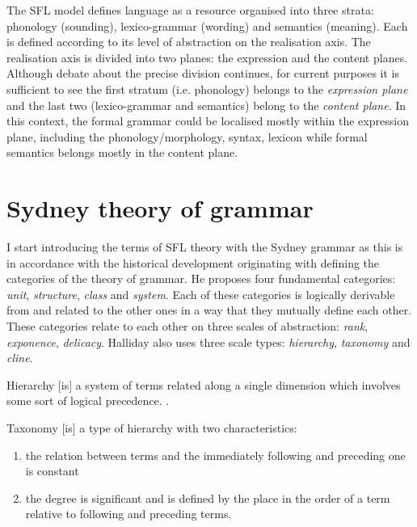     The SFL model defines language as a resource organised into three strata: phonology (sounding), lexico-grammar (wording) and semantics (meaning). Each is defined according to its level of abstraction on the realisation axis. The realisation axis is divided into two planes: the expression and the content planes. 
    Although debate about the precise division continues, for current purposes it is sufficient to see the first stratum (i.e. phonology) belongs to the \textit{expression plane} and the last two (lexico-grammar and semantics) belong to the \textit{content plane}.
    In this context, the formal grammar could be localised mostly within the expression plane, including the phonology/morphology, syntax, lexicon while formal semantics belongs mostly in the content plane.

\section{Sydney theory of grammar}
\label{sec:sydney-theory-of-grammar}
    I start introducing the terms of SFL theory with the Sydney grammar as this is in accordance with the historical development originating with \citet{Halliday2002} defining the categories of the theory of grammar. He proposes four fundamental categories: \textit{unit}, \textit{structure}, \textit{class} and \textit{system}. Each of these categories is logically derivable from and related to the other ones in a way that they mutually define each other. These categories relate to each other on three scales of abstraction: \textit{rank}, \textit{exponence}, \textit{delicacy}. Halliday also uses three scale types: \textit{hierarchy}, \textit{taxonomy} and \textit{cline}.
    
    \begin{definition}[Hierarchy]\label{def:hierarchy}
    	Hierarchy [is] a system of terms related along a single dimension which involves some sort of logical precedence. 
    	\citep[42]{Halliday2002}. 
    \end{definition}
    
    \begin{definition}[Taxonomy]\label{def:taxonomy}
    	Taxonomy [is] a type of hierarchy with two characteristics:
    	\begin{enumerate}
    		\item the relation between terms and the immediately following and preceding one is constant
    		\item the degree is significant and is defined by the place in the order of a term relative to following and preceding terms. \citep[42]{Halliday2002}
    	\end{enumerate}
    \end{definition} 
    

